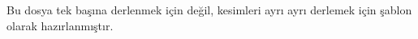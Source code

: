 \documentclass[article]{memoir}
\begin{document}
Bu dosya tek başına derlenmek için değil, kesimleri ayrı ayrı derlemek için şablon olarak hazırlanmıştır.
\end{document}

